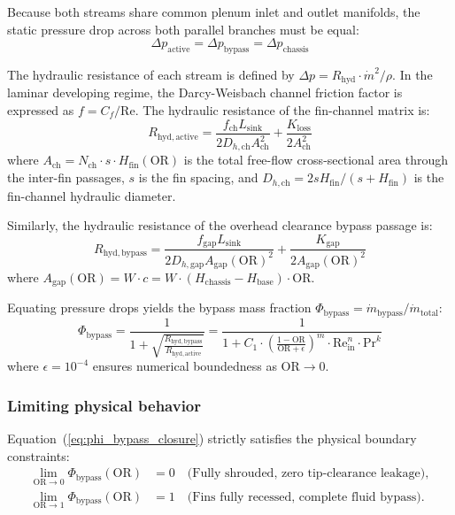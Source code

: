 Because both streams share common plenum inlet and outlet manifolds, the static pressure drop across both parallel branches must be equal:
\begin{equation}
\Delta p_{\mathrm{active}} = \Delta p_{\mathrm{bypass}} = \Delta p_{\mathrm{chassis}}
\label{eq:dp_equality}
\end{equation}

The hydraulic resistance of each stream is defined by $\Delta p = R_{\mathrm{hyd}} \cdot \dot{m}^2 / \rho$. In the laminar developing regime, the Darcy-Weisbach channel friction factor is expressed as $f = C_f / \mathrm{Re}$. The hydraulic resistance of the fin-channel matrix is:
\begin{equation}
R_{\mathrm{hyd,active}} = \frac{f_{\mathrm{ch}} L_{\mathrm{sink}}}{2 D_{h,\mathrm{ch}} A_{\mathrm{ch}}^2} + \frac{K_{\mathrm{loss}}}{2 A_{\mathrm{ch}}^2}
\label{eq:R_active}
\end{equation}
where $A_{\mathrm{ch}} = N_{\mathrm{ch}} \cdot s \cdot H_{\mathrm{fin}}(\mathrm{OR})$ is the total free-flow cross-sectional area through the inter-fin passages, $s$ is the fin spacing, and $D_{h,\mathrm{ch}} = 2 s H_{\mathrm{fin}} / (s + H_{\mathrm{fin}})$ is the fin-channel hydraulic diameter.

Similarly, the hydraulic resistance of the overhead clearance bypass passage is:
\begin{equation}
R_{\mathrm{hyd,bypass}} = \frac{f_{\mathrm{gap}} L_{\mathrm{sink}}}{2 D_{h,\mathrm{gap}} A_{\mathrm{gap}}(\mathrm{OR})^2} + \frac{K_{\mathrm{gap}}}{2 A_{\mathrm{gap}}(\mathrm{OR})^2}
\label{eq:R_bypass}
\end{equation}
where $A_{\mathrm{gap}}(\mathrm{OR}) = W \cdot c = W \cdot (H_{\mathrm{chassis}} - H_{\mathrm{base}}) \cdot \mathrm{OR}$.

Equating pressure drops yields the bypass mass fraction $\Phi_{\mathrm{bypass}} = \dot{m}_{\mathrm{bypass}} / \dot{m}_{\mathrm{total}}$:
\begin{equation}
\Phi_{\mathrm{bypass}} = \frac{1}{1 + \sqrt{\frac{R_{\mathrm{hyd,bypass}}}{R_{\mathrm{hyd,active}}}}} = \frac{1}{1 + C_1 \cdot \left(\frac{1 - \mathrm{OR}}{\mathrm{OR} + \epsilon}\right)^m \cdot \mathrm{Re}_{\mathrm{in}}^n \cdot \mathrm{Pr}^k}
\label{eq:phi_bypass_closure}
\end{equation}
where $\epsilon = 10^{-4}$ ensures numerical boundedness as $\mathrm{OR} \to 0$.

\subsubsection{Limiting physical behavior}
Equation~(\ref{eq:phi_bypass_closure}) strictly satisfies the physical boundary constraints:
\begin{align}
\lim_{\mathrm{OR} \to 0} \Phi_{\mathrm{bypass}}(\mathrm{OR}) &= 0 \quad \text{(Fully shrouded, zero tip-clearance leakage)}, \label{eq:limit_or0} \\
\lim_{\mathrm{OR} \to 1} \Phi_{\mathrm{bypass}}(\mathrm{OR}) &= 1 \quad \text{(Fins fully recessed, complete fluid bypass)}. \label{eq:limit_or1}
\end{align}

